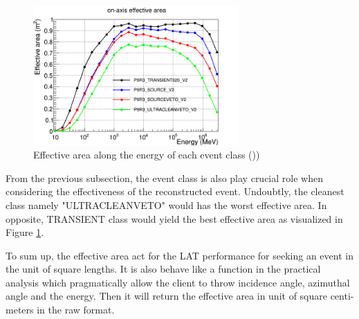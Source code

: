 \begin{figure}[h!]
    \centering
    \includegraphics[width=0.7\textwidth]{content/background/figures/eff_event_class.png}
    \caption{Effective area along the energy of each event class (\cite{lat_p8_performance}))}
    \label{fig:eff_event_class}
\end{figure}


From the previous subsection, the event class is also play crucial 
role when considering the effectiveness of the reconstructed event.
Undoubtly, the cleanest class namely "ULTRACLEANVETO" would has 
the worst effective area. In opposite, TRANSIENT class would yield 
the best effective area as visualized in Figure \ref{fig:eff_event_class}.

To sum up, the effective area act for the LAT performance for seeking 
an event in the unit of square lengths. It is also behave like a function 
in the practical analysis which pragmatically allow the client to 
throw incidence angle, azimuthal angle and the energy. Then it will 
return the effective area in unit of square centi-meters in the raw 
format.